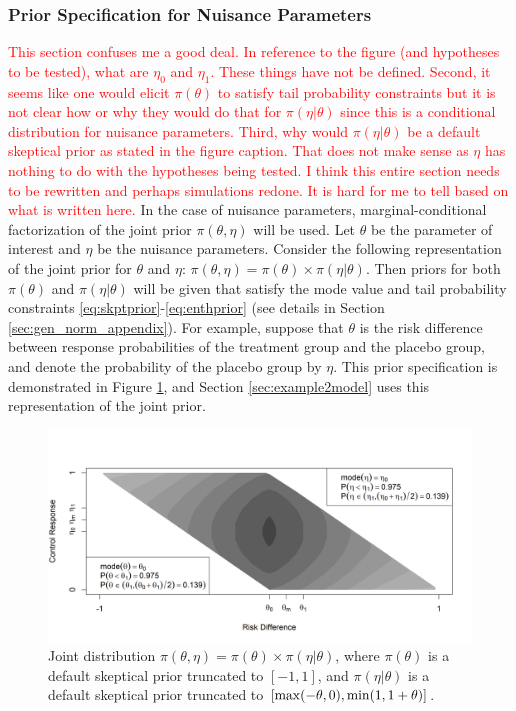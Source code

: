 \documentclass[useAMS,usenatbib,referee]{biom}
\begin{document}
\subsubsection{Prior Specification for Nuisance Parameters}\label{sec:cond_marg}
\textcolor{red}{This section confuses me a good deal. In reference to the figure (and hypotheses to be tested), what are $\eta_0$ and $\eta_1$. These things have not be defined.
Second, it seems like one would elicit $\pi(\theta)$ to satisfy tail probability constraints but it is not clear how or why they would do that for $\pi(\eta|\theta)$ since 
this is a conditional distribution for nuisance parameters. 
Third, why would $\pi(\eta|\theta)$ be a default skeptical prior as stated in the figure caption. That does not make sense as $\eta$ has nothing to do with the 
hypotheses being tested.
I think this entire section needs to be rewritten and perhaps simulations redone. It is hard for me to tell based on what is written here.
}
In the case of nuisance parameters, marginal-conditional factorization of the joint prior $\pi(\theta,\eta)$ will be used. Let $\theta$ be the parameter of interest and $\eta$ be the nuisance parameters. Consider the following representation of the joint prior for $\theta$ and $\eta$: $\pi(\theta,\eta)=\pi(\theta)\times\pi(\eta|\theta)$. Then priors for both $\pi(\theta)$ and $\pi(\eta|\theta)$ will be given that satisfy the mode value and tail probability constraints \eqref{eq:skptprior}-\eqref{eq:enthprior} (see details in Section \ref{sec:gen_norm_appendix}). For example, suppose that $\theta$ is the risk difference between response probabilities of the treatment group and the placebo group, and denote the  probability of the placebo group by $\eta$. This prior specification is demonstrated in Figure \ref{fig:figure5}, and Section \ref{sec:example2model} uses this representation of the joint prior.

\begin{figure}\begin{center}
\includegraphics[width=6in]{figure5a.png}
\caption{Joint distribution $\pi(\theta,\eta)=\pi(\theta)\times\pi(\eta|\theta)$, where $\pi(\theta)$ is a default skeptical prior truncated to $[-1,1]$, and $\pi(\eta|\theta)$ is a default skeptical prior truncated to $[{\mathrm{max}}(-\theta,0),{\mathrm{min}}(1,1+\theta)]$.}
\label{fig:figure5}
 \end{center}
\end{figure}
\end{document}
